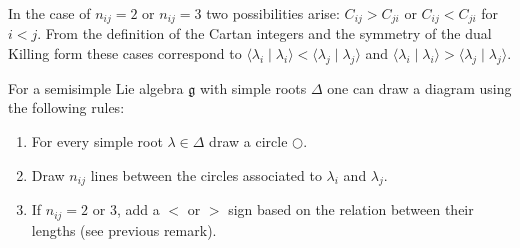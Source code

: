     \begin{remark}
        In the case of $n_{ij} = 2$ or $n_{ij} = 3$ two possibilities arise: $C_{ij}>C_{ji}$ or $C_{ij}<C_{ji}$ for $i<j$. From the definition of the Cartan integers and the symmetry of the dual Killing form these cases correspond to $\langle\lambda_i\mid\lambda_i\rangle<\langle\lambda_j\mid\lambda_j\rangle$ and $\langle\lambda_i\mid\lambda_i\rangle>\langle\lambda_j\mid\lambda_j\rangle$.
    \end{remark}

    \begin{construct}\label{lie:construct_dynkin}
        For a semisimple Lie algebra $\mathfrak{g}$ with simple roots $\Delta$ one can draw a diagram using the following rules:
        \begin{enumerate}
            \item For every simple root $\lambda\in\Delta$ draw a circle $\bigcirc$.
            \item Draw $n_{ij}$ lines between the circles associated to $\lambda_i$ and $\lambda_j$.
            \item If $n_{ij}=2$ or 3, add a $<$ or $>$ sign based on the relation between their lengths (see previous remark).
        \end{enumerate}
    \end{construct}

